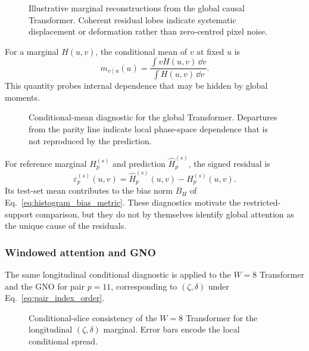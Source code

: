 \begin{figure}[H]
    \centering
    \caption{Illustrative marginal reconstructions from the global causal Transformer. Coherent residual lobes indicate systematic displacement or deformation rather than zero-centred pixel noise.}
    \label{fig:tf_nowindow_marginals}
\end{figure}

For a marginal $H(u,v)$, the conditional mean of $v$ at fixed $u$ is
\begin{equation}
    m_{v\mid u}(u)
    =
    \frac{\int vH(u,v)\,\dd v}{\int H(u,v)\,\dd v}.
    \label{eq:conditional_mean_v_given_u}
\end{equation}
This quantity probes internal dependence that may be hidden by global moments.

\begin{figure}[H]
    \centering
    \caption{Conditional-mean diagnostic for the global Transformer. Departures from the parity line indicate local phase-space dependence that is not reproduced by the prediction.}
    \label{fig:tf_nowindow_conditional_artifact}
\end{figure}

For reference marginal $H_{p}^{(s)}$ and prediction $\widehat{H}_{p}^{(s)}$, the signed residual is
\begin{equation}
    \varepsilon_{p}^{(s)}(u,v)
    =
    \widehat{H}_{p}^{(s)}(u,v)-H_{p}^{(s)}(u,v).
\end{equation}
Its test-set mean contributes to the bias norm $B_H$ of Eq.~\eqref{eq:histogram_bias_metric}. These diagnostics motivate the restricted-support comparison, but they do not by themselves identify global attention as the unique cause of the residuals.

\subsubsection{Windowed attention and GNO}

The same longitudinal conditional diagnostic is applied to the $W=8$ Transformer and the GNO for pair $p=11$, corresponding to $(\zeta,\delta)$ under Eq.~\eqref{eq:pair_index_order}.

\begin{figure}[H]
    \centering
    \caption{Conditional-slice consistency of the $W=8$ Transformer for the longitudinal $(\zeta,\delta)$ marginal. Error bars encode the local conditional spread.}
    \label{fig:tf_conditionals_longitudinal}
\end{figure}

